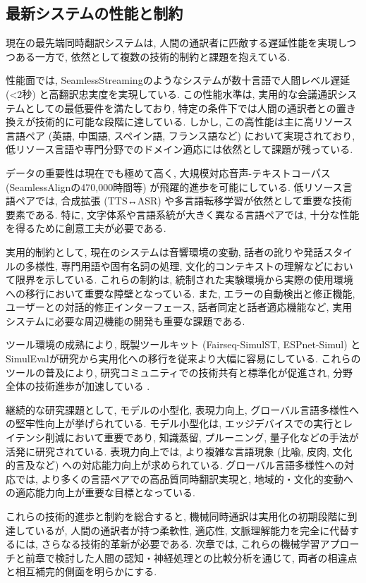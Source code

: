 \subsection{最新システムの性能と制約}

現在の最先端同時翻訳システムは, 人間の通訳者に匹敵する遅延性能を実現しつつある一方で, 依然として複数の技術的制約と課題を抱えている.

性能面では, SeamlessStreamingのようなシステムが数十言語で人間レベル遅延 (<2秒) と高翻訳忠実度を実現している.
この性能水準は, 実用的な会議通訳システムとしての最低要件を満たしており, 特定の条件下では人間の通訳者との置き換えが技術的に可能な段階に達している.
しかし, この高性能は主に高リソース言語ペア (英語, 中国語, スペイン語, フランス語など) において実現されており, 低リソース言語や専門分野でのドメイン適応には依然として課題が残っている.

データの重要性は現在でも極めて高く, 大規模対応音声-テキストコーパス (SeamlessAlignの470,000時間等) が飛躍的進歩を可能にしている.
低リソース言語ペアでは, 合成拡張 (TTS↔ASR) や多言語転移学習が依然として重要な技術要素である.
特に, 文字体系や言語系統が大きく異なる言語ペアでは, 十分な性能を得るために創意工夫が必要である.

実用的制約として, 現在のシステムは音響環境の変動, 話者の訛りや発話スタイルの多様性, 専門用語や固有名詞の処理, 文化的コンテキストの理解などにおいて限界を示している.
これらの制約は, 統制された実験環境から実際の使用環境への移行において重要な障壁となっている.
また, エラーの自動検出と修正機能, ユーザーとの対話的修正インターフェース, 話者同定と話者適応機能など, 実用システムに必要な周辺機能の開発も重要な課題である.

ツール環境の成熟により, 既製ツールキット (Fairseq-SimulST, ESPnet-Simul) とSimulEvalが研究から実用化への移行を従来より大幅に容易にしている.
これらのツールの普及により, 研究コミュニティでの技術共有と標準化が促進され, 分野全体の技術進歩が加速している \cite{wang2020fairseqs2t,yan2023espnet}.

継続的な研究課題として, モデルの小型化, 表現力向上, グローバル言語多様性への堅牢性向上が挙げられている.
モデル小型化は, エッジデバイスでの実行とレイテンシ削減において重要であり, 知識蒸留, プルーニング, 量子化などの手法が活発に研究されている.
表現力向上では, より複雑な言語現象 (比喩, 皮肉, 文化的言及など) への対応能力向上が求められている.
グローバル言語多様性への対応では, より多くの言語ペアでの高品質同時翻訳実現と, 地域的・文化的変動への適応能力向上が重要な目標となっている.

これらの技術的進歩と制約を総合すると, 機械同時通訳は実用化の初期段階に到達しているが, 人間の通訳者が持つ柔軟性, 適応性, 文脈理解能力を完全に代替するには, さらなる技術的革新が必要である.
次章では, これらの機械学習アプローチと前章で検討した人間の認知・神経処理との比較分析を通じて, 両者の相違点と相互補完的側面を明らかにする.